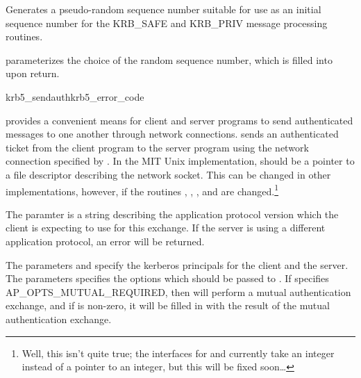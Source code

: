 Generates a pseudo-random sequence number suitable for use as an initial
sequence number for the KRB_SAFE and KRB_PRIV message processing
routines.

 parameterizes the choice of the random sequence number,
which is filled into  upon return.

\begin{funcdecl}{krb5_sendauth}{krb5_error_code}
\funcin
{}
\funcinout
{}
\funcout
{}
\end{funcdecl}

 provides a convenient means for client and
server programs to send authenticated messages to one another through
network connections.   sends an authenticated
ticket from the client program to the server program using the network
connection specified by .  In the MIT Unix implementation,
 should be a pointer to a file descriptor describing the
network socket.  This can be changed in other implementations, however,
if the routines ,
, , and
 are changed.\footnote{Well, this isn't quite
true; the interfaces for  and
 currently take an integer instead of a pointer
to an integer, but this will be fixed soon\ldots}

The paramter  is a string describing the
application protocol version which the client is expecting to use for
this exchange.  If the server is using a different application protocol,
an error will be returned.

The parameters  and  specify the
kerberos principals for the client and the server.  The
 parameters specifies the options which should
be passed to .  If 
specifies AP_OPTS_MUTUAL_REQUIRED, then  will
perform a mutual authentication exchange, and if 
is non-zero, it will be filled in with the result of the mutual
authentication exchange.

